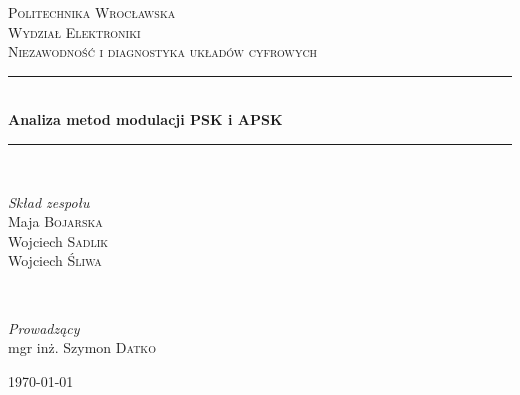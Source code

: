 \documentclass{article}
\begin{document}
\begin{titlepage}
	\newcommand{\HRule}{\rule{\linewidth}{0.5mm}}
	\center
	
	\textsc{\LARGE Politechnika Wrocławska}\\[1.5cm] 	
	\textsc{\Large Wydział Elektroniki}\\[0.5cm] 
	\textsc{\large Niezawodność i diagnostyka układów cyfrowych}\\[0.5cm] 
	
	\HRule\\[0.4cm]
	{\huge\bfseries Analiza metod modulacji PSK i APSK}\\[0.4cm]
	\HRule\\[1.5cm]
	
	\begin{minipage}{0.4\textwidth}
		\begin{flushleft}
			\large
			\textit{Skład zespołu}\\
			Maja \textsc{Bojarska}\\
			Wojciech \textsc{Sadlik}\\
			Wojciech \textsc{Śliwa}\\
		\end{flushleft}
	\end{minipage}
	~
	\begin{minipage}{0.4\textwidth}
		\begin{flushright}
			\large
			\textit{Prowadzący}\\
			mgr inż. Szymon \textsc{Datko}
		\end{flushright}
	\end{minipage}
	
	\vfill\vfill\vfill 
	{\large\today} 
	\vfill 
	
\end{titlepage}

\end{document}
